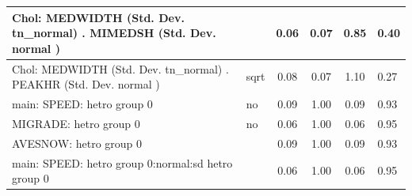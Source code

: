 \begin{table}
\begin{center}
\begin{tabular}{|l|l|c|c|c|l|}
			\hline
			 Chol: MEDWIDTH (Std. Dev. tn_normal) . MIMEDSH (Std. Dev.   normal ) &  & 0.06 & 0.07 & 0.85 & 0.40 \\
			\hline
			 Chol: MEDWIDTH (Std. Dev. tn_normal) . PEAKHR (Std. Dev.   normal ) & sqrt & 0.08 & 0.07 & 1.10 & 0.27 \\
			\hline
			main: SPEED: hetro group 0 & no & 0.09 & 1.00 & 0.09 & 0.93 \\
			\hline
			MIGRADE: hetro group 0 & no & 0.06 & 1.00 & 0.06 & 0.95 \\
			\hline
			AVESNOW: hetro group 0 &  & 0.09 & 1.00 & 0.09 & 0.93 \\
			\hline
			main: SPEED: hetro group 0:normal:sd  hetro group 0 &  & 0.06 & 1.00 & 0.06 & 0.95 \\
			\hline
		\end{tabular}
	\end{center}
\end{table}